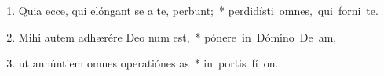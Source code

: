 \begin{flushleft}
\begin{enumerate}[leftmargin=*]
\item Quia ecce, qui elóngant se a te, perbunt;~* \mbox{perdidísti omnes, qui forni  te.}

\item Mihi autem adhærére Deo num est,~* \mbox{pónere in Dómino De  am,}

\item ut annúntiem omnes operatiónes as~* \mbox{in portis fí on.}


\end{enumerate}
\end{flushleft}

